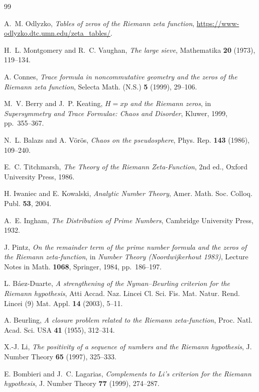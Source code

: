 \documentclass[12pt]{amsart}
\numberwithin{equation}{section}
\theoremstyle{definition}
\begin{document}
\begin{thebibliography}{99}

 A.~M. Odlyzko, 
\textit{Tables of zeros of the Riemann zeta function},
\url{https://www-odlyzko.dtc.umn.edu/zeta_tables/}.

 H.~L. Montgomery and R.~C. Vaughan,
\textit{The large sieve},
Mathematika \textbf{20} (1973), 119--134.

 A. Connes,
\textit{Trace formula in noncommutative geometry and the zeros of the Riemann zeta function},
Selecta Math. (N.S.) \textbf{5} (1999), 29--106.

 M.~V. Berry and J.~P. Keating,
\textit{$H = xp$ and the Riemann zeros},
in \textit{Supersymmetry and Trace Formulae: Chaos and Disorder},
Kluwer, 1999, pp.\ 355--367.

 N.~L. Balazs and A. V\"or\"os,
\textit{Chaos on the pseudosphere},
Phys. Rep. \textbf{143} (1986), 109--240.

 E.~C. Titchmarsh,
\textit{The Theory of the Riemann Zeta-Function},
2nd ed., Oxford University Press, 1986.

 H. Iwaniec and E. Kowalski,
\textit{Analytic Number Theory},
Amer. Math. Soc. Colloq. Publ. \textbf{53}, 2004.

 A.~E. Ingham,
\textit{The Distribution of Prime Numbers},
Cambridge University Press, 1932.

 J. Pintz,
\textit{On the remainder term of the prime number formula and the zeros of
the Riemann zeta-function},
in \textit{Number Theory (Noordwijkerhout 1983)},
Lecture Notes in Math. \textbf{1068}, Springer, 1984, pp.\ 186--197.

 L. B\'aez-Duarte,
\textit{A strengthening of the Nyman--Beurling criterion for the Riemann hypothesis},
Atti Accad. Naz. Lincei Cl. Sci. Fis. Mat. Natur. Rend. Lincei (9) Mat. Appl.
\textbf{14} (2003), 5--11.

 A. Beurling,
\textit{A closure problem related to the Riemann zeta-function},
Proc. Natl. Acad. Sci. USA \textbf{41} (1955), 312--314.

 X.-J. Li,
\textit{The positivity of a sequence of numbers and the Riemann hypothesis},
J. Number Theory \textbf{65} (1997), 325--333.

 E. Bombieri and J.~C. Lagarias,
\textit{Complements to Li's criterion for the Riemann hypothesis},
J. Number Theory \textbf{77} (1999), 274--287.


\end{thebibliography}
\end{document}
